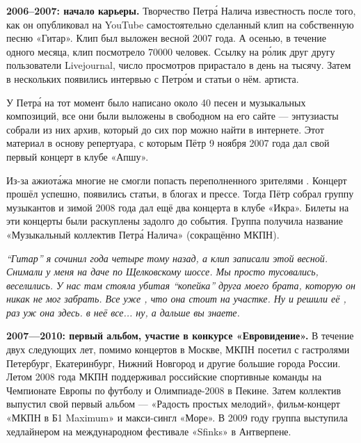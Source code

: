 \textbf{2006--2007: начало карьеры.}
Творчество Петр\'{а} Налича 
известность после того, как он опубликовал на YouTube самостоятельно сделанный клип
на собственную песню «Гитар».
Клип был выложен весной 2007 года. А осенью, в течение одного месяца, клип посмотрело 70000 человек.
Ссылку на р\'{о}лик 
друг другу пользователи Livejournal, число просмотров прирастало в день на тысячу. Затем в нескольких   появились интервью с Петр\'{о}м и статьи о нём.    артиста.

У Петр\'{а} на тот момент было написано около 40 песен и музыкальных композиций, все они были выложены в свободном  на его сайте --- энтузиасты собрали из них архив, который до сих пор можно найти в интернете. Этот материал  в основу репертуара, с которым Пётр 9 ноября 2007 года дал свой первый концерт в клубе «Апшу».

Из-за ажиот\'{а}жа многие не смогли попасть  переполненного зрителями . Концерт прошёл успешно, появились статьи,  в блогах и прессе. Тогда Пётр собрал группу музыкантов и зимой 2008 года дал ещё два концерта в клубе «Икра». Билеты на эти концерты были раскуплены задолго до события. Группа получила название «Музыкальный коллектив Петр\'{а} Налича» (сокращённо МКПН).

    {\it  ``Гитар'' я сочинил года четыре тому назад, а клип записали этой весной. Снимали у меня на даче по Щелковскому шоссе. Мы просто тусовались, веселились. У нас там стояла убитая ``копейка'' друга моего брата, которую он никак не мог забрать. Все уже , что она стоит на участке. Ну и решили её , раз уж она здесь.  в неё все... ну, а дальше вы знаете.}

\textbf{2007---2010: первый альбом, участие в конкурсе «Евровидение».}
В течение двух следующих лет, помимо концертов в Москве, МКПН посетил с гастролями Петербург, Екатеринбург, Нижний Новгород и другие большие города России. Летом 2008 года МКПН поддерживал российские спортивные команды на Чемпионате Европы по футболу и Олимпиаде-2008 в Пекине. Затем коллектив выпустил свой первый альбом --- «Радость простых мелодий», фильм-концерт «МКПН в Б1 Maximum» и макси-сингл «Море». В 2009 году группа выступила хедлайнером на международном фестивале «Sfinks» в Антверпене.

